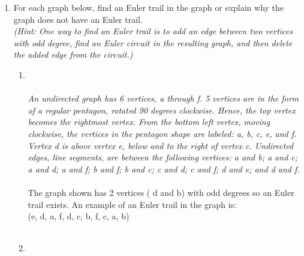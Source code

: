 \documentclass{amsart}
\theoremstyle{definition}
\theoremstyle{Exercise}
\theoremstyle{remark}
\theoremstyle{rule}
\numberwithin{equation}{section}
\begin{document}
\begin{enumerate}[label=(\alph*)]
\newpage
\vspace*{0.25in}
\item
For each graph below, find an Euler trail in the graph or explain why the graph does not have an Euler trail.\\

{\it (Hint: One way to find an Euler trail is to add an edge between two vertices with odd degree, find an Euler circuit in the resulting graph, and then delete the added edge from the circuit.)}\\
\begin{enumerate}[label=(\roman*)]
\item
{}
\\\\
{\color{blue}{\bf Figure 11:} \emph{An undirected graph has 6 vertices, a through f. 5 vertices are in the form of a regular pentagon, rotated 90 degrees clockwise. Hence, the top vertex becomes the rightmost vertex. From the bottom left vertex, moving clockwise, the vertices in the pentagon shape are labeled: a, b, c, e, and f. Vertex d is above vertex e, below and to the right of vertex c. Undirected edges, line segments, are between the following vertices: a and b; a and c; a and d; a and f; b and f; b and c; c and d; c and f; d and e; and d and f.
}
}
\\\\
The graph shown has 2 vertices ( d and b) with odd degrees so an Euler trail exists. An example of an Euler trail in the graph is:\\
(e, d, a, f, d, c, b, f, c, a, b)
\\\\
\item {}
\end{enumerate}
\end{enumerate}
\end{document}

